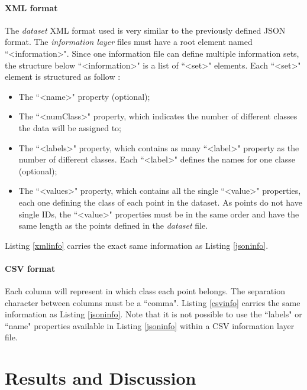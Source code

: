 \documentclass[10pt]{bmc_article}
\newenvironment{bmcformat}{\baselineskip20pt\sloppy\setboolean{publ}{false}}{\baselineskip20pt\sloppy}
\begin{document}
\begin{bmcformat}
\paragraph{XML format}
The {\it{dataset}} XML format used is very similar to the previously defined JSON format. The {\it{information layer}} files must have a root element named  ``\textless information\textgreater ". Since one information file can define multiple information sets, the structure below ``\textless information\textgreater " is a list of ``\textless set\textgreater " elements. Each ``\textless set\textgreater " element is structured as follow :
\begin{itemize}
\item{The ``\textless name\textgreater " property (optional);}
\item{The ``\textless numClass\textgreater " property, which indicates the number of different classes the data will be assigned to;}
\item{The ``\textless labels\textgreater " property, which contains as many ``\textless label\textgreater " property as the number of different classes. Each ``\textless label\textgreater " defines the names for one classe (optional);}
\item{The ``\textless values\textgreater " property, which contains all the single ``\textless value\textgreater " properties, each one defining the class of each point in the dataset. As points do not have single IDs, the ``\textless value\textgreater " properties must be in the same order and have the same length as the points defined in the {\it{dataset}} file.}
\end{itemize}
Listing \ref{xmlinfo} carries the exact same information as Listing \ref{jsoninfo}.


\paragraph{CSV format}
Each column will represent in which class each point belongs. The separation character between columns must be a ``comma". Listing \ref{csvinfo} carries the same information as Listing \ref{jsoninfo}. Note that it is not possible to use the ``labels" or ``name" properties available in Listing \ref{jsoninfo} within a CSV information layer file. 




\section{Results and Discussion}



\end{bmcformat}
\end{document}
